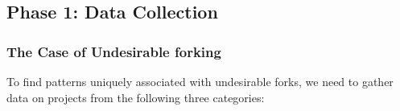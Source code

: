 \documentclass[11pt]{report}
\begin{document}
%
%
%                   
%
% 
%
%
%

\subsection{Phase 1: Data Collection}
\label{DataCollection}

\subsubsection{The Case of Undesirable forking}
To find patterns uniquely associated with undesirable forks, we need to gather data on projects from the following three categories: 
\end{document}
